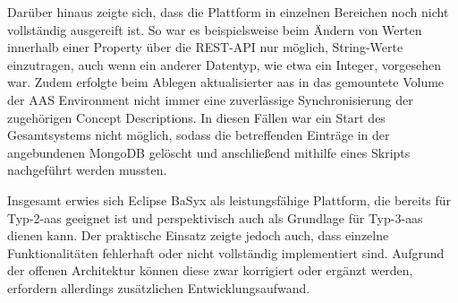 Darüber hinaus zeigte sich, dass die Plattform in einzelnen Bereichen noch nicht vollständig ausgereift ist.
So war es beispielsweise beim Ändern von Werten innerhalb einer Property über die REST-API nur möglich, String-Werte einzutragen, auch wenn ein anderer Datentyp, wie etwa ein Integer, vorgesehen war.
Zudem erfolgte beim Ablegen aktualisierter \acs{aas} in das gemountete Volume der AAS Environment nicht immer eine zuverlässige Synchronisierung der zugehörigen Concept Descriptions.
In diesen Fällen war ein Start des Gesamtsystems nicht möglich, sodass die betreffenden Einträge in der angebundenen MongoDB gelöscht und anschließend mithilfe eines Skripts nachgeführt werden mussten.

Insgesamt erwies sich Eclipse BaSyx als leistungsfähige Plattform, die bereits für Typ-2-\acs{aas} geeignet ist und perspektivisch auch als Grundlage für Typ-3-\acs{aas} dienen kann.
Der praktische Einsatz zeigte jedoch auch, dass einzelne Funktionalitäten fehlerhaft oder nicht vollständig implementiert sind.
Aufgrund der offenen Architektur können diese zwar korrigiert oder ergänzt werden, erfordern allerdings zusätzlichen Entwicklungsaufwand.









